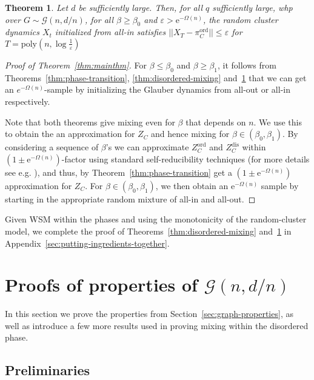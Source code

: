 \documentclass[11pt]{article}
\theoremstyle{plain}
\newtheorem{theorem}{Theorem}
\let\epsilon=\varepsilon
\newcommand{\G}{\mathcal{G}}
\newcommand{\emm}{\mathrm{e}}
\newcommand{\1}{\mathbb{1}}
\newcommand{\ord}{\mathrm{ord}}
\newcommand{\dis}{\mathrm{dis}}
\begin{document}
\begin{theorem}\label{thm:ordered-mixing}
    Let $d$ be sufficiently large. Then, for all $q$ sufficiently large,  whp over \(G\sim\G(n,d/n)\), for all $\beta\geq \beta_0$ and \(\epsilon > \emm^{-\Omega(n)}\), the random cluster dynamics \(X_t\) initialized from all-in satisfies \(||X_T-\pi^\ord_C||\leq\epsilon\) for \(T = \mathrm{poly}(n,\log\frac{1}{\epsilon})\)
\end{theorem}

\begin{proof}[Proof of Theorem~\ref{thm:mainthm}]
    For \(\beta \leq \beta_0\) and \(\beta\geq\beta_1\), it follows from Theorems~\ref{thm:phase-transition}, \ref{thm:disordered-mixing} and~\ref{thm:ordered-mixing} that we can get an \(e^{-\Omega(n)}\)-sample by initializing the Glauber dynamics from all-out or all-in respectively.

    Note that both theorems give mixing even for \(\beta\) that depends on \(n\). We use this to obtain the an approximation for \(Z_C\) and hence mixing for \(\beta\in(\beta_0,\beta_1)\). By considering a sequence of \(\beta\)'s we can approximate \(Z_C^\ord\) and \(Z_C^\dis\) within \((1\pm \emm^{-\Omega(n)})\)-factor using standard self-reducibility techniques (for more details see e.g. \cite{fastpolymers, bezakova}), and thus, by Theorem~\ref{thm:phase-transition} get a \((1\pm \emm^{-\Omega(n)})\) approximation for \(Z_C\). For \(\beta\in (\beta_0,\beta_1)\), we then obtain an \(\emm^{-\Omega(n)}\) sample by starting in the appropriate random mixture of all-in and all-out.
\end{proof}
Given WSM within the phases and using the monotonicity of the random-cluster model, we complete the proof of Theorems~\ref{thm:disordered-mixing} and~\ref{thm:ordered-mixing} in Appendix~\ref{sec:putting-ingredients-together}.



\appendix

\section{Proofs of properties of \(\G(n,d/n)\)}\label{sec:graph-proofs}

In this section we prove the properties from Section~\ref{sec:graph-properties}, as well as introduce a few more results used in proving mixing within the disordered phase.


\subsection{Preliminaries}
\end{document}
